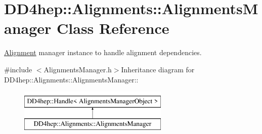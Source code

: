 \hypertarget{class_d_d4hep_1_1_alignments_1_1_alignments_manager}{
\section{DD4hep::Alignments::AlignmentsManager Class Reference}
\label{class_d_d4hep_1_1_alignments_1_1_alignments_manager}
}


\hyperlink{class_d_d4hep_1_1_alignments_1_1_alignment}{Alignment} manager instance to handle alignment dependencies.  


{\ttfamily \#include $<$AlignmentsManager.h$>$}Inheritance diagram for DD4hep::Alignments::AlignmentsManager::\begin{figure}[H]
\begin{center}
\leavevmode
\includegraphics[height=2cm]{class_d_d4hep_1_1_alignments_1_1_alignments_manager}
\end{center}
\end{figure}
